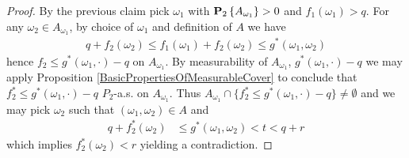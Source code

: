 \begin{proof}
By the previous claim pick $\omega_1$ with $\sprobability{A_{\omega_1}}{2} > 0$ and $f_1(\omega_1) > q$.  For any $\omega_2 \in A_{\omega_1}$, by choice of $\omega_1$ and definition of $A$ we have
\begin{align*}
q + f_2(\omega_2) \leq f_1(\omega_1) + f_2(\omega_2) \leq g^*(\omega_1, \omega_2)
\end{align*}
hence $f_2 \leq g^*(\omega_1, \cdot) - q$ on $A_{\omega_1}$.  By measurability of $A_{\omega_1}$, $g^*(\omega_1, \cdot) - q$ we may apply Proposition \ref{BasicPropertiesOfMeasurableCover}  to conclude that $f^*_2 \leq g^*(\omega_1, \cdot) - q$ $P_2$-a.s. on $A_{\omega_1}$.  Thus $A_{\omega_1} \cap \lbrace f^*_2 \leq g^*(\omega_1, \cdot) - q \rbrace \neq \emptyset$ and we may pick $\omega_2$ such that $(\omega_1, \omega_2) \in A$ and 
\begin{align*}
q + f_2^*(\omega_2) &\leq g^*(\omega_1, \omega_2) < t < q+r
\end{align*}
which implies $f_2^*(\omega_2) < r$ yielding a contradiction.
\end{proof}

